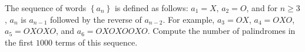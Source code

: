 The sequence of words $\left\{a_n\right\}$ is defined as follows: $a_1=X$, $a_2=O$, and for $n\geq3$, $a_n$ is $a_{n-1}$ followed by the reverse of $a_{n-2}$. For example, $a_3=OX$, $a_4=OXO$, $a_5=OXOXO$, and $a_6=OXOXOOXO$. Compute the number of palindromes in the first $1000$ terms of this sequence.